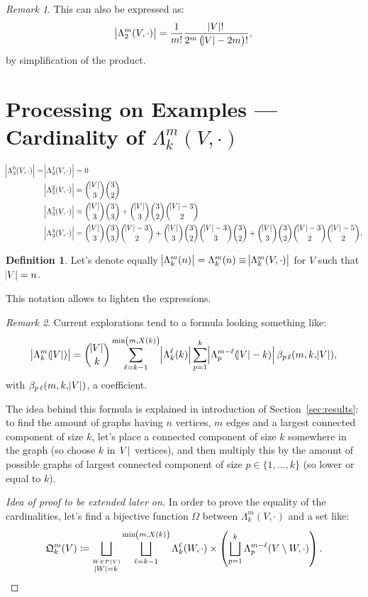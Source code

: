 \documentclass{article}
\theoremstyle{definition}
\newtheorem{definition}[lemma]{Definition}
\theoremstyle{remark}
\newtheorem*{remark}{Remark}
\begin{document}
		\begin{remark} This can also be expressed as:
		\[\abs {\Lambda_2^m(V, \cdot)} = \frac 1{m!}\frac {\abs V!}{2^m\left(\abs V-2m\right)!},\]
		by simplification of the product.
		\end{remark}

\section{Processing on Examples --- Cardinality of $\Lambda_k^m(V, \cdot)$}
	\begin{align*}
		\abs {\Lambda_3^0(V, \cdot)} = \abs {\Lambda_3^1(V, \cdot)} &= 0 \\
		\abs {\Lambda_3^2(V, \cdot)} &= \binom {\abs V}3\binom 32 \\
		\abs {\Lambda_3^3(V, \cdot)} &= \binom {\abs V}3\binom 33 + \binom {\abs V}3\binom 32\binom {\abs V-3}2 \\
		\abs {\Lambda_3^4(V, \cdot)} &= \binom {\abs V}3\binom 33\binom {\abs V-3}2 + \binom {\abs V}3\binom 32\binom {\abs V-3}3\binom 32 + \binom {\abs V}3\binom 32\binom {\abs V-3}2\binom {\abs V-5}2.
	\end{align*}

	\begin{definition} Let's denote equally $\abs {\Lambda_k^m(n)} = \Lambda_k^m(n) \equiv \abs {\Lambda_k^m(V, \cdot)}$ for $V$ such that $\abs V = n$.
	\end{definition}

	This notation allows to lighten the expressions.

	\begin{remark} Current explorations tend to a formula looking something like:
	\[\abs {\Lambda_k^m(\abs V)}
		= \binom {\abs V}k\sum_{\ell=k-1}^{\min\left(m, X(k)\right)}\abs {\Lambda_k^\ell(k)}\sum_{p=1}^k\abs {\Lambda_p^{m-\ell}(\abs V-k)}\beta_{p\,\ell}(m, k, \abs V),\]
	with $\beta_{p\,\ell}(m, k, \abs V)$, a coefficient.

	The idea behind this formula is explained in introduction of Section~\ref{sec:results}: to find the amount of graphs having $n$ vertices, $m$ edges
	and a largest connected component of size $k$, let's place a connected component of size $k$ somewhere in the graph (so choose $k$ in $\abs V$ vertices), and then multiply this
	by the amount of possible graphs of largest connected component of size $p \in \{1, \ldots, k\}$ (so lower or equal to $k$).
	\end{remark}

	\begin{proof}[Idea of proof to be extended later on] In order to prove the equality of the cardinalities, let's find a bijective function $\Omega$ between
	$\Lambda_k^m(V, \cdot)$ and a set like:
	\[\mathfrak Q_k^m(V) \coloneqq \bigsqcup_{\stackrel {W \in \mathcal P(V)}{\abs W = k}}\bigsqcup_{\ell=k-1}^{\min\left(m, X(k)\right)}
		\Lambda_k^\ell(W, \cdot) \times \left(\bigsqcup_{p=1}^k \Lambda_p^{m-\ell}(V \setminus W, \cdot)\right).\]
	\end{proof}
\end{document}
